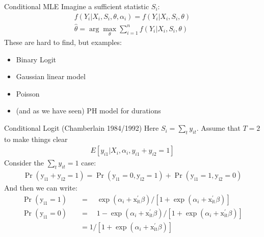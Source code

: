 \documentclass[xcolor=pdftex,dvipsnames,table,mathserif,aspectratio=169]{beamer}
\begin{document}
\begin{frame}{Conditional MLE}
Imagine a sufficient statistic $S_i$:
\begin{align*}
f\left(Y_{i} | X_{i}, S_{i}, \theta, \alpha_{i}\right)=f\left(Y_{i} | X_{i}, S_{i}, \theta\right)\\
\hat{\theta}=\arg \max _{\theta} \sum_{i=1}^{n} f\left(Y_{i} | X_{i}, S_{i}, \theta\right)
\end{align*}
These are hard to find, but examples:
\begin{itemize}
\item Binary Logit
\item Gaussian linear model
\item Poisson
\item (and as we have seen) PH model for durations
\end{itemize}
\end{frame}




\begin{frame}{Conditional Logit  (Chamberlain 1984/1992)} 
Here $S_i = \sum_{t} y_{it}$. Assume that $T=2$ to make things clear
\begin{align*}
E[y_{i1} | X_i, \alpha_i, y_{i1}+y_{i2}=1]
\end{align*}
Consider the $\sum_{t} y_{it}=1$ case:
\begin{align*}
\operatorname{Pr}\left(\mathrm{y}_{\mathrm{i} 1}+\mathrm{y}_{\mathrm{i} 2}=1\right)=\operatorname{Pr}\left(\mathrm{y}_{\mathrm{i} 1}=0, \mathrm{y}_{\mathrm{i} 2}=1\right)+\operatorname{Pr}\left(\mathrm{y}_{\mathrm{i} 1}=1, \mathrm{y}_{\mathrm{i} 2}=0\right)
\end{align*}
And then we can write:
\begin{align*}
\operatorname{Pr}\left(\mathrm{y}_{\mathrm{i} 1}=1\right) \quad&=\quad \exp \left(\alpha_i+\mathrm{x}_{\mathrm{it}}^{\prime} \beta\right) /\left[1+\exp \left(\alpha_i+\mathrm{x}_{\mathrm{it}}^{\prime} \beta\right)\right]\\
\operatorname{Pr}\left(\mathrm{y}_{\mathrm{i} 1}=0\right) \quad&=\quad 1-\exp \left(\alpha_i+\mathrm{x}_{\mathrm{it}}^{\prime} \beta\right) /\left[1+\exp \left(\alpha_i+\mathrm{x}_{\mathrm{it}}^{\prime} \beta\right)\right]\\
&=1 /\left[1+\exp \left(\alpha_i+\mathrm{x}_{\mathrm{it}}^{\prime} \beta\right)\right]
\end{align*}
\end{frame}
\end{document}
